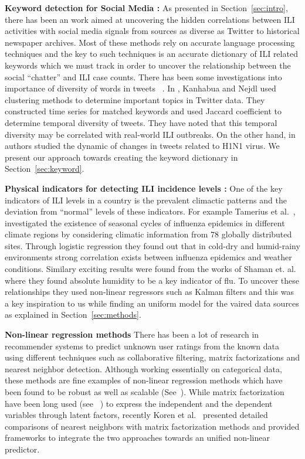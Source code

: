 \textbf{Keyword detection for Social Media :} 
As presented in Section~\ref{sec:intro}, there has been an work aimed at uncovering the hidden
correlations between ILI activities with social media signals from sources as diverse 
as Twitter to historical newspaper archives. Most of these methods rely on 
accurate language processing techniques and the key to such techniques is an 
accurate dictionary of ILI related keywords which we must track in order to 
uncover the relationship between the social ``chatter'' and ILI case counts. 
There has been some investigations into importance of diversity of words
in tweets ~\cite{ref5, ref6}. In
\cite{ref5}, Kanhabua and Nejdl used clustering methods to determine
important topics in Twitter data. They constructed time series for
matched keywords and used Jaccard coefficient to determine temporal
diversity of tweets. They have noted that this temporal diversity may be
correlated with real-world ILI outbreaks. On the other hand, in \cite{ref6}
authors studied the dynamic of changes in tweets related to H1N1 virus. We 
present our approach towards creating the keyword dictionary in Section~\ref{sec:keyword}.

\textbf{ Physical indicators for detecting ILI incidence levels :} 
One of the key indicators of ILI levels in a country is the prevalent 
climactic patterns and the deviation from ``normal'' levels of these 
indicators. For example Tamerius et al.~\cite{ref9}, investigated the existence of seasonal 
cycles of influenza epidemics in different climate regions
by considering
climatic information from 78 globally distributed sites. Through logistic
regression they found out that in cold-dry and humid-rainy
environments strong correlation exists between influenza epidemics and
weather conditions. Similary exciting results were found from the works
of Shaman et. al.~\cite{Shaman_orig_humidity_link, Shaman_humidity_USA}
where they found absolute humidity to be a key indicator of flu. To uncover 
these relationships they used non-linear regressors such as Kalman filters 
and this was a key inspiration to us while finding an uniform model for the
vaired data sources as explained in Section~\ref{sec:methods}.

\textbf{Non-linear regression methods}
There has been a lot of research in recommender systems to predict unknown user 
ratings from the known data using different techniques such as collaborative 
filtering, matrix factorizations and nearest neighbor detection. Although
working essentially on categorical data, these methods are fine examples of non-linear
regression methods which have been found to be robust as well as scalable (See~\cite{koren2008factor}).
While matrix factorization have been long used (see ~\cite{canny2002factor}) to 
express the independent and the dependent variables through latent factors, 
recently Koren et al.~\cite{koren2008factor} presented detailed comparisons
of nearest neighbors with matrix factorization methods and provided frameworks to 
integrate the two approaches towards an unified non-linear predictor.

